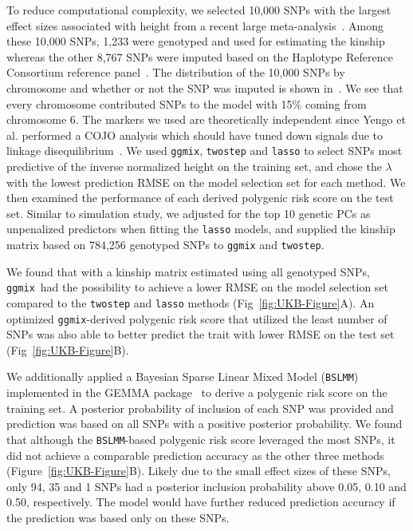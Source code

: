 \documentclass[10pt,letterpaper]{article}
\newcommand{\ggmix}{\texttt{ggmix}}
\begin{document}
To reduce computational complexity, we selected 10,000 SNPs with the largest effect sizes associated with height from a recent large meta-analysis~\cite{yengo2018meta}. Among these 10,000 SNPs, 1,233 were genotyped and used for estimating the kinship whereas the other 8,767 SNPs were imputed based on the Haplotype Reference Consortium reference panel~\cite{mccarthy2016reference}. The distribution of the 10,000 SNPs by chromosome and whether or not the SNP was imputed is shown in~. We see that every chromosome contributed SNPs to the model with 15\% coming from chromosome 6. The markers we used are theoretically independent since Yengo et al. performed a COJO analysis which should have tuned down signals due to linkage disequilibrium~\cite{yengo2018meta}. We used \ggmix, \texttt{twostep} and \texttt{lasso} to select SNPs most predictive of the inverse normalized height on the training set, and chose the $\lambda$ with the lowest prediction RMSE on the model selection set for each method. We then examined the performance of each derived polygenic risk score on the test set. Similar to simulation study, we adjusted for the top 10 genetic PCs as unpenalized predictors when fitting the \texttt{lasso} models, and supplied the kinship matrix based on 784,256 genotyped SNPs to \texttt{ggmix} and \texttt{twostep}.

We found that with a kinship matrix estimated using all genotyped SNPs, \ggmix ~had the possibility to achieve a lower RMSE on the model selection set compared to the \texttt{twostep} and \texttt{lasso} methods (Fig~\ref{fig:UKB-Figure}A). An optimized \ggmix-derived polygenic risk score that utilized the least number of SNPs was also able to better predict the trait with lower RMSE on the test set (Fig~\ref{fig:UKB-Figure}B).

We additionally applied a Bayesian Sparse Linear Mixed Model (\texttt{BSLMM})~\cite{zhou2013polygenic} implemented in the GEMMA package~\cite{zhou2012genome} to derive a polygenic risk score on the training set. A posterior probability of inclusion of each SNP was provided and prediction was based on all SNPs with a positive posterior probability. We found that although the \texttt{BSLMM}-based polygenic risk score leveraged the most SNPs, it did not achieve a comparable prediction accuracy as the other three methods (Figure~\ref{fig:UKB-Figure}B). Likely due to the small effect sizes of these SNPs, only 94, 35 and 1 SNPs had a posterior inclusion probability above 0.05, 0.10 and 0.50, respectively. The model would have further reduced prediction accuracy if the prediction was based only on these SNPs.
\end{document}
